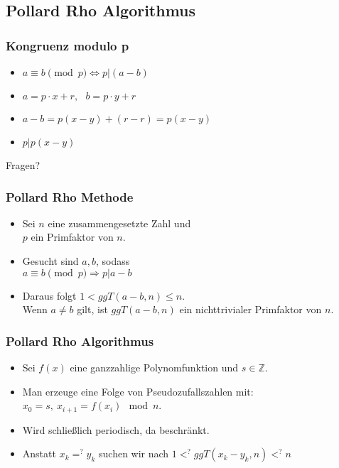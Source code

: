 \documentclass[mathserif, compress, german]{beamer}
\begin{document}
\subsection{Pollard Rho Algorithmus}

\begin{frame}
  \frametitle{Kongruenz modulo p}
  \begin{itemize}
	\item<1->$a \equiv b \pmod p \Leftrightarrow p|(a-b)$
\vspace{3mm}
	\item<2->$a=p\cdot x +r,\ \ \ b= p\cdot y +r$
\vspace{3mm}
	\item<3->$a-b=p(x-y)+(r-r)=p(x-y)$
\vspace{3mm}
	\item<4->$p|p(x-y)$
  \end{itemize}
\end{frame}

\begin{frame}
\centering Fragen?
\end{frame}


\begin{frame}
  \frametitle{Pollard Rho Methode}
  \begin{itemize}
    \item<2-> Sei $n$ eine zusammengesetzte Zahl und \\$p$ ein Primfaktor von $n$.
      \vspace{3mm}
    \item<3-> Gesucht sind $a, b$, sodass\\
              $a \equiv b \pmod p \Rightarrow p|a-b$ \\
      \vspace{3mm}
    \item<4-> Daraus folgt $1<ggT(a-b,n) \leq  n$. \\Wenn $a\not = b$ gilt, ist $ggT(a-b,n)$ ein nichttrivialer Primfaktor von $n$.
  \end{itemize}
\end{frame}

\begin{frame}
  \frametitle{Pollard Rho Algorithmus}
  \begin{itemize}
    \item<2-> Sei $f(x)$ eine ganzzahlige Polynomfunktion und $s \in \mathbb{Z}$.
     \vspace{3mm}
    \item<3-> Man erzeuge eine Folge von Pseudozufallszahlen mit:\\ $x_0= s, \ x_{i+1}=f(x_i)\mod n$.
   \vspace{3mm}
    \item<4-> Wird schlie\ss{}lich periodisch, da beschr\"ankt.
    \vspace{3mm}
    \item<5-> Anstatt $x_k=^?y_k$ suchen wir nach $1 <^? ggT(x_k - y_k, n)<^? n$
  \end{itemize}
\end{frame}
\end{document}
